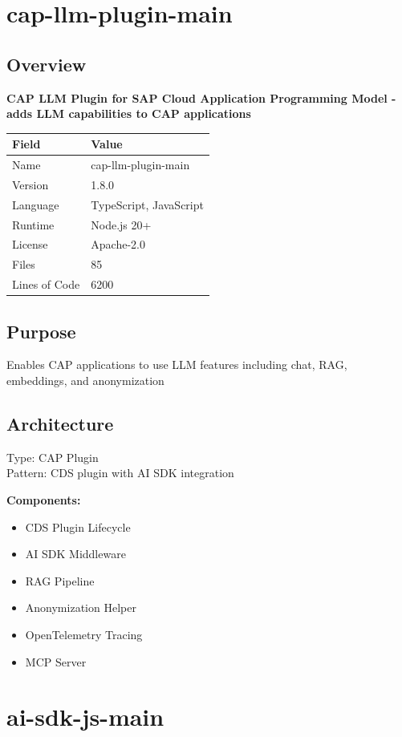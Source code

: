 \documentclass[11pt,a4paper]{article}
\begin{document}
\section{cap-llm-plugin-main}

\subsection{Overview}

\textbf{CAP LLM Plugin for SAP Cloud Application Programming Model - adds LLM capabilities to CAP applications}

\begin{tabular}{@{}ll@{}}
\toprule
\textbf{Field} & \textbf{Value} \\
\midrule
Name & cap-llm-plugin-main \\
Version & 1.8.0 \\
Language & TypeScript, JavaScript \\
Runtime & Node.js 20+ \\
License & Apache-2.0 \\
Files & 85 \\
Lines of Code & 6200 \\
\bottomrule
\end{tabular}

\subsection{Purpose}
Enables CAP applications to use LLM features including chat, RAG, embeddings, and anonymization

\subsection{Architecture}
Type: CAP Plugin \\
Pattern: CDS plugin with AI SDK integration

\textbf{Components:}\begin{itemize}[noitemsep]
\item CDS Plugin Lifecycle
\item AI SDK Middleware
\item RAG Pipeline
\item Anonymization Helper
\item OpenTelemetry Tracing
\item MCP Server
\end{itemize}

\newpage


\section{ai-sdk-js-main}
\end{document}
